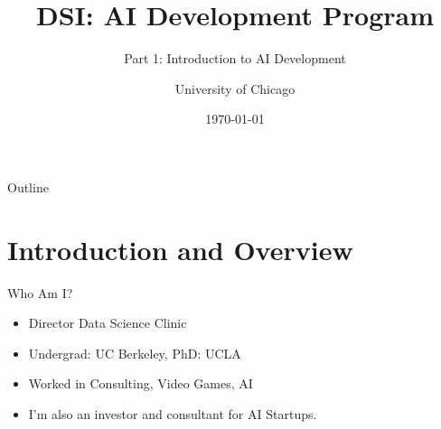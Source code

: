 \documentclass[aspectratio=169]{beamer}
\title{DSI: AI Development Program}
\subtitle{Part 1: Introduction to AI Development}
\author{University of Chicago}
\date{\today}
\begin{document}
\frame{\titlepage}

\begin{frame}{Outline}
  \tableofcontents
\end{frame}

\section*{Introduction and Overview}


\begin{frame}{Who Am I?}
\begin{itemize}
\item Director Data Science Clinic
\item Undergrad: UC Berkeley, PhD: UCLA
\item Worked in Consulting, Video Games, AI
\item I'm also an investor and consultant for AI Startups.
\end{itemize}
\end{frame}
\end{document}
